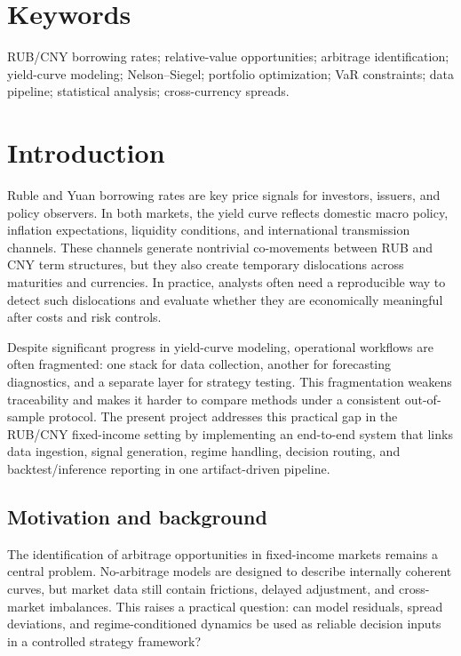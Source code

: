 \documentclass[a4paper,12pt]{extarticle}
\begin{document}
\section*{Keywords}
\noindent RUB/CNY borrowing rates; relative-value opportunities; arbitrage identification; yield-curve modeling; Nelson--Siegel; portfolio optimization; VaR constraints; data pipeline; statistical analysis; cross-currency spreads.

\pagebreak

\section{Introduction}

Ruble and Yuan borrowing rates are key price signals for investors, issuers, and policy observers. In both markets, the yield curve reflects domestic macro policy, inflation expectations, liquidity conditions, and international transmission channels. These channels generate nontrivial co-movements between RUB and CNY term structures, but they also create temporary dislocations across maturities and currencies. In practice, analysts often need a reproducible way to detect such dislocations and evaluate whether they are economically meaningful after costs and risk controls.

Despite significant progress in yield-curve modeling, operational workflows are often fragmented: one stack for data collection, another for forecasting diagnostics, and a separate layer for strategy testing. This fragmentation weakens traceability and makes it harder to compare methods under a consistent out-of-sample protocol. The present project addresses this practical gap in the RUB/CNY fixed-income setting by implementing an end-to-end system that links data ingestion, signal generation, regime handling, decision routing, and backtest/inference reporting in one artifact-driven pipeline.

\subsection{Motivation and background}

The identification of arbitrage opportunities in fixed-income markets remains a central problem. No-arbitrage models are designed to describe internally coherent curves, but market data still contain frictions, delayed adjustment, and cross-market imbalances. This raises a practical question: can model residuals, spread deviations, and regime-conditioned dynamics be used as reliable decision inputs in a controlled strategy framework?
\end{document}

